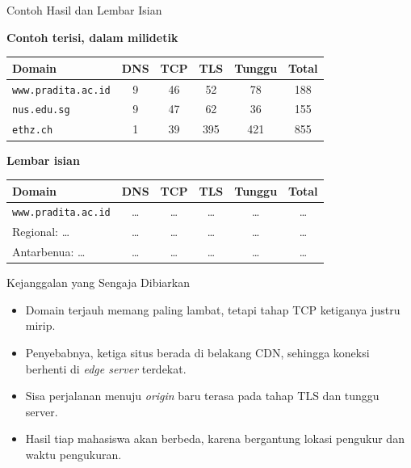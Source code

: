 \documentclass[aspectratio=169, table, 12pt]{beamer}
\begin{document}
\begin{frame}{{\Large Contoh Hasil dan Lembar Isian}}
  \vspace{3pt}
  \centering
  {\small \textbf{Contoh terisi, dalam milidetik}\\[3pt]
  \begin{tabularx}{0.9\textwidth}{Xccccc}
    \hline
    \textbf{Domain} & \textbf{DNS} & \textbf{TCP} & \textbf{TLS} & \textbf{Tunggu} & \textbf{Total} \\
    \hline
    \texttt{www.pradita.ac.id} & 9 & 46 & 52 & 78 & 188 \\
    \hline
    \texttt{nus.edu.sg} & 9 & 47 & 62 & 36 & 155 \\
    \hline
    \texttt{ethz.ch} & 1 & 39 & 395 & 421 & 855 \\
    \hline
  \end{tabularx}}

  \vspace{6pt}
  {\small \textbf{Lembar isian}\\[3pt]
  \begin{tabularx}{0.9\textwidth}{Xccccc}
    \hline
    \textbf{Domain} & \textbf{DNS} & \textbf{TCP} & \textbf{TLS} & \textbf{Tunggu} & \textbf{Total} \\
    \hline
    \texttt{www.pradita.ac.id} & \dots & \dots & \dots & \dots & \dots \\
    \hline
    Regional: \dots & \dots & \dots & \dots & \dots & \dots \\
    \hline
    Antarbenua: \dots & \dots & \dots & \dots & \dots & \dots \\
    \hline
  \end{tabularx}}
\end{frame}

\begin{frame}{{\Large Kejanggalan yang Sengaja Dibiarkan}}
  \vspace{10pt}
  \begin{itemize}
    \item Domain terjauh memang paling lambat, tetapi tahap TCP ketiganya
          justru mirip.
    \item Penyebabnya, ketiga situs berada di belakang CDN, sehingga koneksi
          berhenti di \textit{edge server} terdekat.
    \item Sisa perjalanan menuju \textit{origin} baru terasa pada tahap TLS
          dan tunggu server.
    \item Hasil tiap mahasiswa akan berbeda, karena bergantung lokasi
          pengukur dan waktu pengukuran.
  \end{itemize}
\end{frame}
\end{document}
